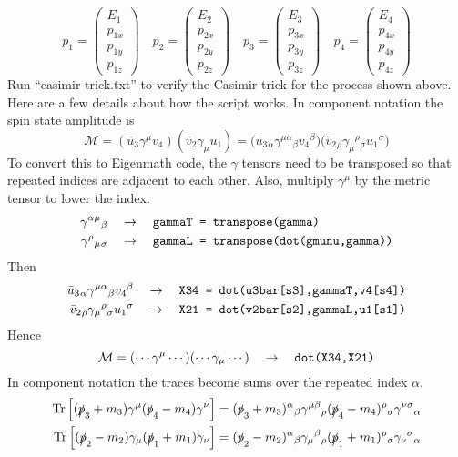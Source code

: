 \documentclass[12pt]{article}
\begin{document}
$$
p_1=\begin{pmatrix}E_1\\p_{1x}\\p_{1y}\\p_{1z}\end{pmatrix}\quad
p_2=\begin{pmatrix}E_2\\p_{2x}\\p_{2y}\\p_{2z}\end{pmatrix}\quad
p_3=\begin{pmatrix}E_3\\p_{3x}\\p_{3y}\\p_{3z}\end{pmatrix}\quad
p_4=\begin{pmatrix}E_4\\p_{4x}\\p_{4y}\\p_{4z}\end{pmatrix}
$$
%
Run ``casimir-trick.txt'' to verify the Casimir trick for the process shown above.
Here are a few details about how the script works.
In component notation the spin state amplitude is
$$
\mathcal{M}
=
(\bar{u}_3\gamma^\mu v_4)(\bar{v}_2\gamma_\mu u_1)
=
\big(\bar{u}_3{}_\alpha\gamma^{\mu\alpha}{}_\beta v_4{}^\beta\big)
\big(\bar{v}_2{}_\rho\gamma_\mu{}^\rho{}_\sigma u_1{}^\sigma\big)
$$
%
To convert this to Eigenmath code,
the $\gamma$ tensors need to be transposed
so that repeated indices are adjacent to each other.
Also, multiply $\gamma^\mu$ by the metric tensor to lower the index.
\begin{align*}
\gamma^{\alpha\mu}{}_\beta\quad&\rightarrow\quad
\text{\tt gammaT = transpose(gamma)}\\
\gamma^\rho{}_\mu{}_\sigma\quad&\rightarrow\quad
\text{\tt gammaL = transpose(dot(gmunu,gamma))}
\end{align*}
%
Then
\begin{align*}
\bar{u}_3{}_\alpha\gamma^{\mu\alpha}{}_\beta v_4{}^\beta
\quad&\rightarrow\quad
\text{\tt X34 = dot(u3bar[s3],gammaT,v4[s4])}
\\
\bar{v}_2{}_\rho\gamma_\mu{}^\rho{}_\sigma u_1{}^\sigma
\quad&\rightarrow\quad
\text{\tt X21 = dot(v2bar[s2],gammaL,u1[s1])}
\end{align*}
Hence
$$
\mathcal{M}=(\cdots\gamma^\mu\cdots)(\cdots\gamma_\mu\cdots)
\quad\rightarrow\quad
\text{\tt dot(X34,X21)}
$$
%
In component notation the traces become sums over the repeated index $\alpha$.
\begin{align*}
\mathop{\rm Tr}\left[(\slashed{p}_3+m_3)\gamma^\mu(\slashed{p}_4-m_4)\gamma^\nu\right]
&=
(\slashed{p}_3+m_3)^\alpha{}_\beta
\gamma^{\mu\beta}{}_\rho
(\slashed{p}_4-m_4)^\rho{}_\sigma
\gamma^{\nu\sigma}{}_\alpha
\\
\mathop{\rm Tr}\left[(\slashed{p}_2-m_2)\gamma_\mu(\slashed{p}_1+m_1)\gamma_\nu\right]
&=
(\slashed{p}_2-m_2)^\alpha{}_\beta
\gamma_\mu{}^\beta{}_\rho
(\slashed{p}_1+m_1)^\rho{}_\sigma
\gamma_\nu{}^\sigma{}_\alpha
\end{align*}
\end{document}
